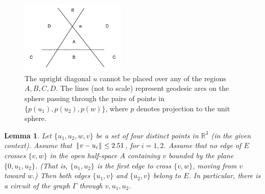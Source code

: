 \documentclass[11pt]{amsart}
\newcommand{\ring}[1]{\mathbb{#1}}
\def\|{{\hskip0.1em|\hskip-0.15em|\hskip0.1em}}
\newtheorem{lemma}{Lemma}
\begin{document}
\begin{figure}
\begin{center}
\includegraphics[width=5cm]{nogo}
\end{center}
\caption{The upright diagonal $u$ cannot be placed over any of
the regions $A,B,C,D$.  The lines (not to scale) represent geodesic arcs on the
sphere passing through the pairs of points in $\{p(u_1),p(u_2),p(w)\}$,
where $p$ denotes projection to the unit sphere.}
\label{fig:nogo}
\end{figure}

\begin{lemma}\label{lemma:circuit} 
Let $\{u_1,u_2,w,v\}$ be a set of four distinct points
in $\ring{R}^3$ (in the given context).  
Assume that
 $\|v-u_i\|\le 2.51$, for $i=1,2$.
Assume that no edge of $E$ crosses $\{v,w\}$
in the open 
half-space $A$ containing $v$ bounded by the plane $\{0,u_1,u_2\}$.
(That is, $\{u_1,u_2\}$ is the first edge to cross $\{v,w\}$, moving
from $v$ toward $w$.)
Then 
both edges $\{u_1,v\}$ and $\{u_2,v\}$ belong to $E$.
In particular, there is a circuit of the graph $\Gamma$ through $v,u_1,u_2$.
\end{lemma}
\end{document}
